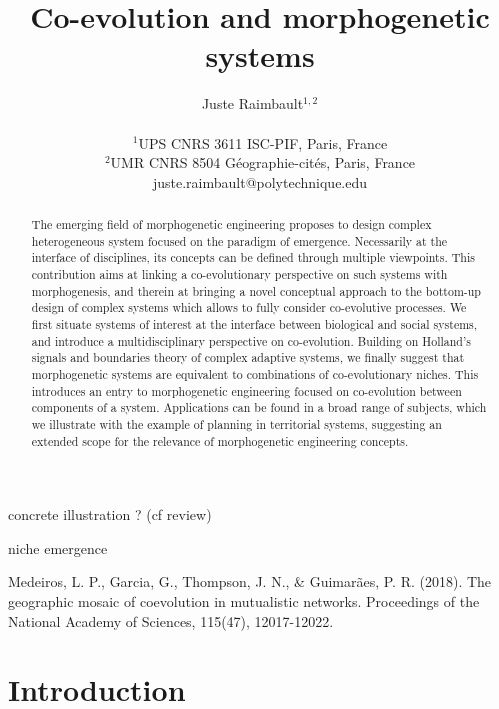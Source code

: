 \documentclass[letterpaper]{article}
\title{\vspace{-1cm}Co-evolution and morphogenetic systems}
\author{Juste Raimbault$^{1,2}$\\
\mbox{}\\
$^1$UPS CNRS 3611 ISC-PIF, Paris, France \\
$^2$UMR CNRS 8504 G{\'e}ographie-cit{\'e}s, Paris, France \\
juste.raimbault@polytechnique.edu} %
\begin{document}
\maketitle


\begin{abstract}
The emerging field of morphogenetic engineering proposes to design complex heterogeneous system focused on the paradigm of emergence. Necessarily at the interface of disciplines, its concepts can be defined through multiple viewpoints. This contribution aims at linking a co-evolutionary perspective on such systems with morphogenesis, and therein at bringing a novel conceptual approach to the bottom-up design of complex systems which allows to fully consider co-evolutive processes. We first situate systems of interest at the interface between biological and social systems, and introduce a multidisciplinary perspective on co-evolution. Building on Holland's signals and boundaries theory of complex adaptive systems, we finally suggest that morphogenetic systems are equivalent to combinations of co-evolutionary niches. This introduces an entry to morphogenetic engineering focused on co-evolution between components of a system. Applications can be found in a broad range of subjects, which we illustrate with the example of planning in territorial systems, suggesting an extended scope for the relevance of morphogenetic engineering concepts.
\end{abstract}



\cite{von2012swarm} concrete illustration ? (cf review)


\cite{gatti2018niche} niche emergence


 
 
Medeiros, L. P., Garcia, G., Thompson, J. N., & Guimarães, P. R. (2018). The geographic mosaic of coevolution in mutualistic networks. Proceedings of the National Academy of Sciences, 115(47), 12017-12022.


\section{Introduction}
\end{document}
